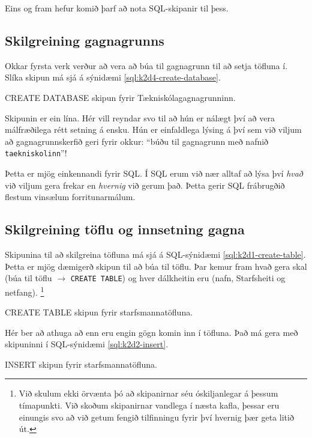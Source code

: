Eins og fram hefur komið þarf að nota SQL-skipanir til þess.

\subsection{Skilgreining gagnagrunns}
Okkar fyrsta verk verður að vera að búa til gagnagrunn til að setja töfluna í. Slíka skipun má sjá á sýnidæmi \ref{sql:k2d4-create-database}.

\begin{example}
\caption{CREATE DATABASE skipun fyrir Tækniskólagagnagrunninn.}
\label{sql:k2d4-create-database}
\centering
{}
\end{example}

Skipunin er ein lína. Hér vill reyndar svo til að hún er nálægt því að vera málfræðilega rétt setning á ensku. Hún er einfaldlega lýsing á því sem við viljum að gagnagrunnskerfið geri fyrir okkur: ``búðu til gagnagrunn með nafnið \verb|taekniskolinn|''!

Þetta er mjög einkennandi fyrir SQL. Í SQL erum við nær alltaf að lýsa því \emph{hvað} við viljum gera frekar en \emph{hvernig} við gerum það. Þetta gerir SQL frábrugðið flestum vinsælum forritunarmálum.

\subsection{Skilgreining töflu og innsetning gagna}
Skipunina til að skilgreina töfluna má sjá á SQL-sýnidæmi \ref{sql:k2d1-create-table}. Þetta er mjög dæmigerð skipun til að búa til töflu. Þar kemur fram hvað gera skal (búa til töflu $\rightarrow$ \verb|CREATE TABLE|) og hver dálkheitin eru (nafn, Starfsheiti og netfang). \footnote[][-2cm]{Við skulum ekki örvænta þó að skipanirnar séu óskiljanlegar á þessum tímapunkti. Við skoðum skipanirnar vandlega í næsta kafla, þessar eru einungis svo að við getum fengið tilfinningu fyrir því hvernig þær geta litið út.}

\begin{example}[h]
\caption{CREATE TABLE skipun fyrir starfsmannatöfluna.}
\label{sql:k2d1-create-table}
\centering
{}
\end{example}

Hér ber að athuga að enn eru engin gögn komin inn í töfluna. Það má gera með skipuninni í SQL-sýnidæmi \ref{sql:k2d2-insert}.

\begin{example}[h]
\caption{INSERT skipun fyrir starfsmannatöfluna.}
\label{sql:k2d2-insert}
\centering
{\small
{}
}
\end{example}


